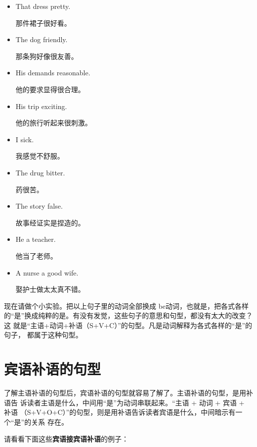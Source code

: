 \begin{itemize}
\item  That dress  pretty.

  那件裙子很好看。
\item  The dog  friendly.

  那条狗好像很友善。
\item  His demands  reasonable.

  他的要求显得很合理。
\item  His trip  exciting.

  他的旅行听起来很刺激。
\item  I  sick.

  我感觉不舒服。
\item  The drug  bitter.

  药很苦。
\item  The story  false.

  故事经证实是捏造的。
\item  He  a teacher.

  他当了老师。
\item  A nurse  a good wife.

  娶护士做太太真不错。
\end{itemize}

现在请做个小实验。把以上句子里的动词全部换成 be动词，也就是，把各式各样
的“是”换成纯粹的是。有没有发觉，这些句子的意思和句型，都没有太大的改变？这
就是“主语+动词+补语（S+V+C）”的句型。凡是动词解释为各式各样的“是”的句子，
都属于这种句型。

\section{宾语补语的句型}

了解主语补语的句型后，宾语补语的句型就容易了解了。主语补语的句型，是用补语告
诉读者主语是什么，中间用“是”为动词串联起来。“主语 + 动词 + 宾语 + 补语
（S+V+O+C）”的句型，则是用补语告诉读者宾语是什么，中间暗示有一个“是”的关系
存在。

请看看下面这些\textbf{宾语接宾语补语}的例子：

